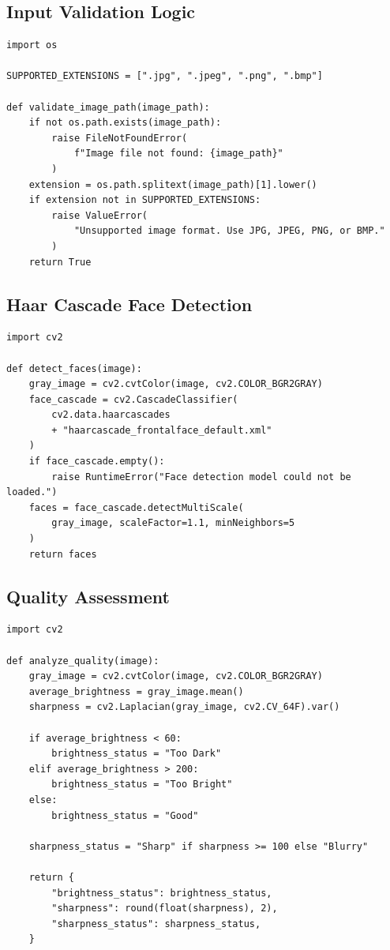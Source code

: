 \documentclass[11pt,a4paper]{article}
\begin{document}
\subsection{Input Validation Logic}
\begin{lstlisting}[caption={Validation Logic in input\_validator.py}]
import os

SUPPORTED_EXTENSIONS = [".jpg", ".jpeg", ".png", ".bmp"]

def validate_image_path(image_path):
    if not os.path.exists(image_path):
        raise FileNotFoundError(
            f"Image file not found: {image_path}"
        )
    extension = os.path.splitext(image_path)[1].lower()
    if extension not in SUPPORTED_EXTENSIONS:
        raise ValueError(
            "Unsupported image format. Use JPG, JPEG, PNG, or BMP."
        )
    return True
\end{lstlisting}

\subsection{Haar Cascade Face Detection}
\begin{lstlisting}[caption={Face Detection in face\_detector.py}]
import cv2

def detect_faces(image):
    gray_image = cv2.cvtColor(image, cv2.COLOR_BGR2GRAY)
    face_cascade = cv2.CascadeClassifier(
        cv2.data.haarcascades
        + "haarcascade_frontalface_default.xml"
    )
    if face_cascade.empty():
        raise RuntimeError("Face detection model could not be loaded.")
    faces = face_cascade.detectMultiScale(
        gray_image, scaleFactor=1.1, minNeighbors=5
    )
    return faces
\end{lstlisting}

\subsection{Quality Assessment}
\begin{lstlisting}[caption={Brightness and Sharpness Evaluation in quality\_analyzer.py}]
import cv2

def analyze_quality(image):
    gray_image = cv2.cvtColor(image, cv2.COLOR_BGR2GRAY)
    average_brightness = gray_image.mean()
    sharpness = cv2.Laplacian(gray_image, cv2.CV_64F).var()

    if average_brightness < 60:
        brightness_status = "Too Dark"
    elif average_brightness > 200:
        brightness_status = "Too Bright"
    else:
        brightness_status = "Good"

    sharpness_status = "Sharp" if sharpness >= 100 else "Blurry"

    return {
        "brightness_status": brightness_status,
        "sharpness": round(float(sharpness), 2),
        "sharpness_status": sharpness_status,
    }
\end{lstlisting}
\end{document}
